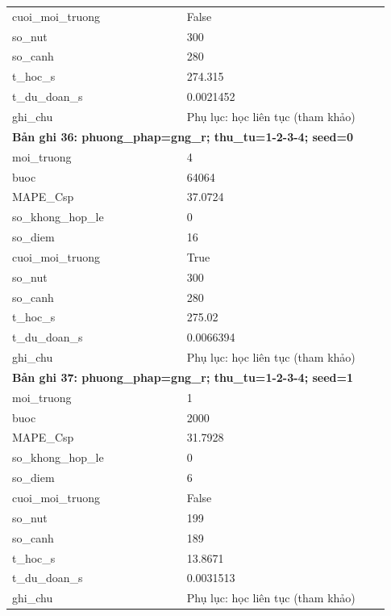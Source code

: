 \begin{longtable}{p{0.43\linewidth}p{0.50\linewidth}}
cuoi\_\allowbreak moi\_\allowbreak truong & False \\
so\_\allowbreak nut & 300 \\
so\_\allowbreak canh & 280 \\
t\_\allowbreak hoc\_\allowbreak s & 274.315 \\
t\_\allowbreak du\_\allowbreak doan\_\allowbreak s & 0.0021452 \\
ghi\_\allowbreak chu & Phụ lục: học liên tục (tham khảo) \\
\midrule
\multicolumn{2}{p{0.95\linewidth}}{\textbf{Bản ghi 36: phuong\_phap=gng\_r; thu\_tu=1-2-3-4; seed=0}} \\
moi\_\allowbreak truong & 4 \\
buoc & 64064 \\
MAPE\_\allowbreak Csp & 37.0724 \\
so\_\allowbreak khong\_\allowbreak hop\_\allowbreak le & 0 \\
so\_\allowbreak diem & 16 \\
cuoi\_\allowbreak moi\_\allowbreak truong & True \\
so\_\allowbreak nut & 300 \\
so\_\allowbreak canh & 280 \\
t\_\allowbreak hoc\_\allowbreak s & 275.02 \\
t\_\allowbreak du\_\allowbreak doan\_\allowbreak s & 0.0066394 \\
ghi\_\allowbreak chu & Phụ lục: học liên tục (tham khảo) \\
\midrule
\multicolumn{2}{p{0.95\linewidth}}{\textbf{Bản ghi 37: phuong\_phap=gng\_r; thu\_tu=1-2-3-4; seed=1}} \\
moi\_\allowbreak truong & 1 \\
buoc & 2000 \\
MAPE\_\allowbreak Csp & 31.7928 \\
so\_\allowbreak khong\_\allowbreak hop\_\allowbreak le & 0 \\
so\_\allowbreak diem & 6 \\
cuoi\_\allowbreak moi\_\allowbreak truong & False \\
so\_\allowbreak nut & 199 \\
so\_\allowbreak canh & 189 \\
t\_\allowbreak hoc\_\allowbreak s & 13.8671 \\
t\_\allowbreak du\_\allowbreak doan\_\allowbreak s & 0.0031513 \\
ghi\_\allowbreak chu & Phụ lục: học liên tục (tham khảo) \\

\end{longtable}
